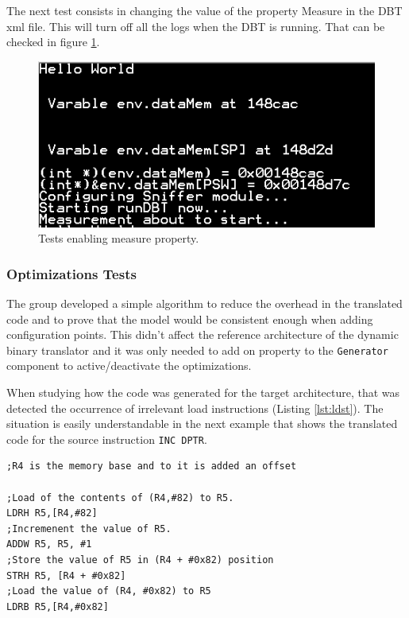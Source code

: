 The next test consists in changing the value of the property Measure in the DBT xml file. This will turn off all the logs when the DBT is running. That can be checked in figure \ref{fig:val4}.

\begin{figure}[H]
\centerline{
\includegraphics[scale=0.6]{images/val4}
}
\caption{Tests enabling measure property.}
\label{fig:val4}
\end{figure}

\subsubsection{Optimizations Tests}

\par The group developed a simple algorithm to reduce the overhead in the translated code and to prove that the model would be consistent enough when adding configuration points. This didn't affect the reference architecture of the dynamic binary translator and it was only needed to add on property to the \texttt{Generator} component to active/deactivate the optimizations.
\par When studying how the code was generated for the target architecture, that was detected the occurrence of irrelevant load instructions (Listing \ref{lst:ldst}). The situation is easily understandable in the next example that shows the translated code for the source instruction \texttt{INC DPTR}.
\begin{lstlisting}[language={[x86masm]Assembler},caption=Fragment of the generated code from DBT.,label=lst:ldst]
;R4 is the memory base and to it is added an offset

;Load of the contents of (R4,#82) to R5.	
LDRH R5,[R4,#82]
;Incremenent the value of R5.
ADDW R5, R5, #1
;Store the value of R5 in (R4 + #0x82) position
STRH R5, [R4 + #0x82]
;Load the value of (R4, #0x82) to R5
LDRB R5,[R4,#0x82]
\end{lstlisting}

